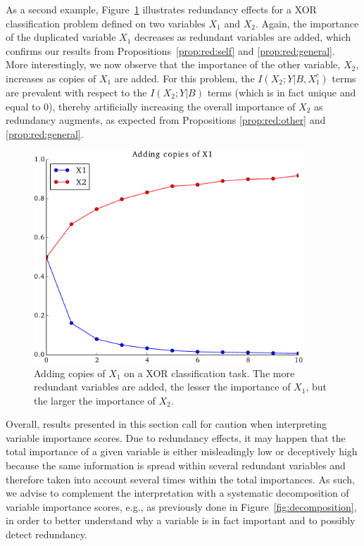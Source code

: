 As a second example, Figure~\ref{fig:7:red:xor} illustrates redundancy effects
for a XOR classification problem defined on two variables $X_1$ and $X_2$.
Again, the importance of the duplicated variable $X_1$  decreases as redundant
variables are added, which confirms our results from
Propositions~\ref{prop:red:self} and \ref{prop:red:general}. More
interestingly, we now observe that the importance of the other variable, $X_2$,
increases as copies of $X_1$ are added. For this problem, the
$I(X_2;Y|B,X_1^c)$ terms are prevalent with respect to the $I(X_2;Y|B)$ terms
(which is in fact unique and equal to $0$), thereby artificially increasing the
overall importance of $X_2$ as redundancy augments, as expected from
Propositions \ref{prop:red:other} and \ref{prop:red:general}.

\begin{figure}
\centering
\includegraphics[width=0.9\textwidth]{figures/ch7_red_xor.pdf}
\caption{Adding copies of $X_1$ on a XOR classification task. The more redundant
         variables are added, the lesser the importance of $X_1$, but the larger
         the importance of $X_2$.}
\label{fig:7:red:xor}
\end{figure}

Overall, results presented in this section call for caution when interpreting
variable importance scores. Due to redundancy effects, it may happen that the
total importance of a given variable is either misleadingly low or deceptively
high because the same information is spread within several redundant variables
and therefore taken into account several times within the total importances. As
such, we advise to complement the interpretation with a systematic
decomposition of variable importance scores, e.g., as previously done in
Figure~\ref{fig:decomposition}, in order to better understand why a variable is
in fact important and to possibly detect redundancy.


